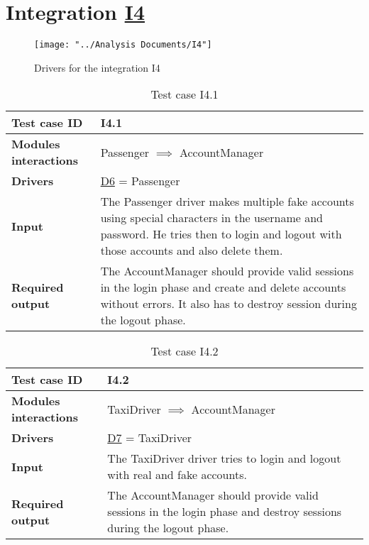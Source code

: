 \section{Integration \hyperref[I4]{I4} \label{int_I4}}

\begin{figure}[H]
\centering
\texttt{[image: "../Analysis Documents/I4"]}
\caption{Drivers for the integration I4}
\end{figure}

\begin{table}[H]
	\begin{tabular}{ l | p{} }
		\textbf{Test case ID} & I4.1 \\ \hline
		\textbf{Modules interactions} & Passenger $\implies$ AccountManager \\ \hline
		\textbf{Drivers} &  \hyperref[D6]{D6} = Passenger \\ \hline
		\textbf{Input} &  The Passenger driver makes multiple fake accounts using special characters in the username and password. He tries then to login and logout with those accounts and also delete them. \\ \hline
		\textbf{Required output} & The AccountManager should provide valid sessions in the login phase and create and delete accounts without errors. It also has to destroy session during the logout phase.
	\end{tabular}
	\caption{Test case I4.1}
\end{table}

\begin{table}[H]
	\begin{tabular}{ l | p{} }
		\textbf{Test case ID} & I4.2 \\ \hline
		\textbf{Modules interactions} & TaxiDriver $\implies$ AccountManager \\ \hline
		\textbf{Drivers} &  \hyperref[D7]{D7} = TaxiDriver \\ \hline
		\textbf{Input} &  The TaxiDriver driver tries to login and logout with real and fake accounts. \\ \hline
		\textbf{Required output} & The AccountManager should provide valid sessions in the login phase and destroy sessions during the logout phase.
	\end{tabular}
	\caption{Test case I4.2}
\end{table}